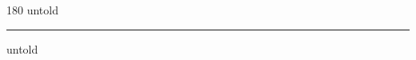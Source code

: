 
\begin{frame}
\begin{center}
\begin{turn}{180}
{\fontsize{2.5cm}{1em}\selectfont untold}
\end{turn}
\vspace{1em}\par  
\hrule
\vspace{1em}\par  
{\fontsize{2.5cm}{1em}\selectfont untold}
\end{center}
\end{frame}
